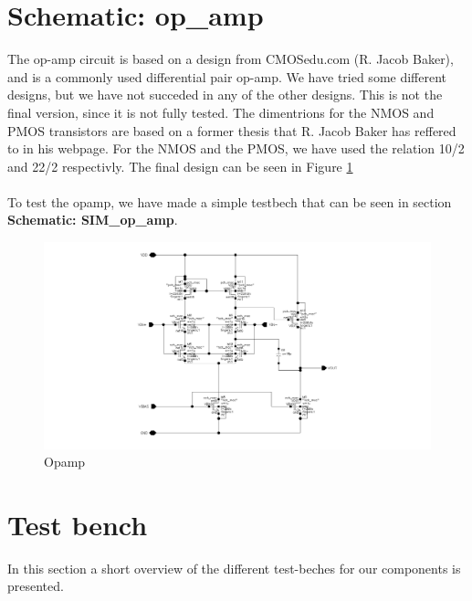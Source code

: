 \documentclass[english, a4paper,11pt]{article}
\begin{document}
\section*{Schematic: op\_amp}
The op-amp circuit is based on a design from CMOSedu.com (R. Jacob Baker), and is a commonly used differential pair op-amp. We have tried some different designs, but we have not succeded in 
any of the other designs. This is not the final version, since it is not fully tested. The dimentrions for the NMOS and PMOS transistors are based on a former thesis that R. Jacob Baker has 
reffered to in his webpage. For the NMOS and the PMOS, we have used the relation 10/2 and 22/2 respectivly. The final design can be seen in Figure \ref{opamp}\\
\\
To test the opamp, we have made a simple testbech that can be seen in section \textbf{Schematic: SIM\_op\_amp}.
\begin{figure}[!ht]
 \centering
   \includegraphics[width=\textwidth]{img/op_amp_3}
   \caption{Opamp}
   \label{opamp}
\end{figure}

\section{Test bench}
In this section a short overview of the different test-beches for our components is presented.
\end{document}
